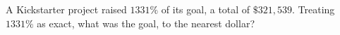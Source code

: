 A Kickstarter project raised $1331\%$ of its goal, a total of $\$321{,}539$. Treating $1331\%$ as exact, what was the goal, to the nearest dollar?
